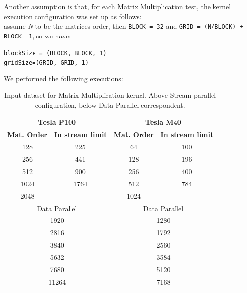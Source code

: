 Another assumption is that, for each Matrix Multiplication test, the kernel execution configuration was set up as follows:\\
assume \textit{N} to be the matrices order, then \texttt{BLOCK = 32} and
\texttt{GRID = (N/BLOCK) + BLOCK -1}, so we have:
\begin{center}	
	\texttt{blockSize = (BLOCK, BLOCK, 1)}\\
	\texttt{gridSize=(GRID, GRID, 1)}
\end{center}

We performed the following executions:
	\begin{table}	
		\centering
		\begin{tabular}{| c | c | c | c |} 
			\hline
			
			 \multicolumn{2}{c}{\textbf{Tesla P100}} & \multicolumn{2}{c}{\textbf{Tesla M40}} \\ [0.5ex]
			\hline
			
			\textbf{Mat. Order} & \textbf{In stream limit} & \textbf{Mat. Order} & \textbf{In stream limit}  \\ 
			\hline\hline
			128 & 225 & 64 & 100  \\ 
			\hline	
			256 & 441 & 128 & 196  \\ 
			\hline	
			512 & 900 & 256 & 400  \\ 
			\hline		
			1024 & 1764 & 512 & 784  \\ 
			\hline			
			2048 &  & 1024 &  \\
			\hline
			\hline				
			
			\multicolumn{2}{c}{Data Parallel} &  \multicolumn{2}{c}{Data Parallel} \\ [0.5ex]
			\hline\hline
			\multicolumn{2}{c}{1920} & \multicolumn{2}{c}{1280} \\ [0.5ex]
			\hline			
			\multicolumn{2}{c}{2816} & \multicolumn{2}{c}{1792} \\ [0.5ex]
			\hline
			\multicolumn{2}{c}{3840} & \multicolumn{2}{c}{2560} \\ [0.5ex]
			\hline
			\multicolumn{2}{c}{5632} & \multicolumn{2}{c}{3584} \\ [0.5ex]
			\hline
			\multicolumn{2}{c}{7680} & \multicolumn{2}{c}{5120} \\ [0.5ex]
			\hline
			\multicolumn{2}{c}{11264} & \multicolumn{2}{c}{7168} \\ [0.5ex]
			\hline

		\end{tabular}
		\caption{Input dataset for Matrix Multiplication kernel. Above Stream parallel configuration, below Data Parallel correspondent.}	
		\label{tab:matdata}		
	\end{table}
	

